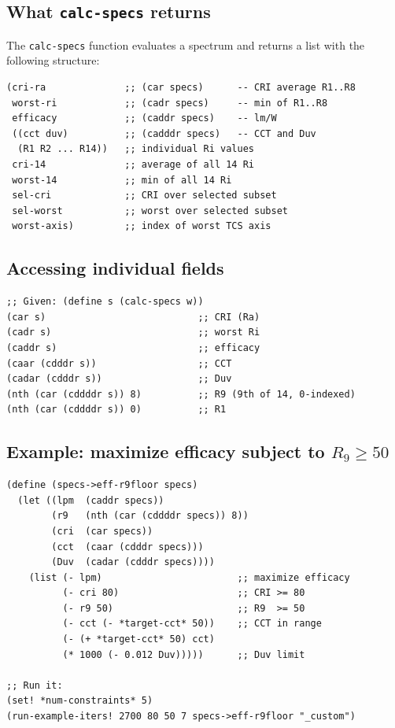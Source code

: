 \documentclass[11pt]{article}
\newcommand{\cmd}[1]{\texttt{#1}}
\begin{document}
\subsection{What \texorpdfstring{\texttt{calc-specs}}{calc-specs} returns}

The \cmd{calc-specs} function evaluates a spectrum and returns a list
with the following structure:

\begin{lstlisting}[style=scheme]
(cri-ra              ;; (car specs)      -- CRI average R1..R8
 worst-ri            ;; (cadr specs)     -- min of R1..R8
 efficacy            ;; (caddr specs)    -- lm/W
 ((cct duv)          ;; (cadddr specs)   -- CCT and Duv
  (R1 R2 ... R14))   ;; individual Ri values
 cri-14              ;; average of all 14 Ri
 worst-14            ;; min of all 14 Ri
 sel-cri             ;; CRI over selected subset
 sel-worst           ;; worst over selected subset
 worst-axis)         ;; index of worst TCS axis
\end{lstlisting}

\subsection{Accessing individual fields}

\begin{lstlisting}[style=scheme]
;; Given: (define s (calc-specs w))
(car s)                           ;; CRI (Ra)
(cadr s)                          ;; worst Ri
(caddr s)                         ;; efficacy
(caar (cdddr s))                  ;; CCT
(cadar (cdddr s))                 ;; Duv
(nth (car (cddddr s)) 8)          ;; R9 (9th of 14, 0-indexed)
(nth (car (cddddr s)) 0)          ;; R1
\end{lstlisting}

\subsection{Example: maximize efficacy subject to \texorpdfstring{$R_9 \geq 50$}{R9 >= 50}}

\begin{lstlisting}[style=scheme]
(define (specs->eff-r9floor specs)
  (let ((lpm  (caddr specs))
        (r9   (nth (car (cddddr specs)) 8))
        (cri  (car specs))
        (cct  (caar (cdddr specs)))
        (Duv  (cadar (cdddr specs))))
    (list (- lpm)                        ;; maximize efficacy
          (- cri 80)                     ;; CRI >= 80
          (- r9 50)                      ;; R9  >= 50
          (- cct (- *target-cct* 50))    ;; CCT in range
          (- (+ *target-cct* 50) cct)
          (* 1000 (- 0.012 Duv)))))      ;; Duv limit

;; Run it:
(set! *num-constraints* 5)
(run-example-iters! 2700 80 50 7 specs->eff-r9floor "_custom")
\end{lstlisting}
\end{document}
